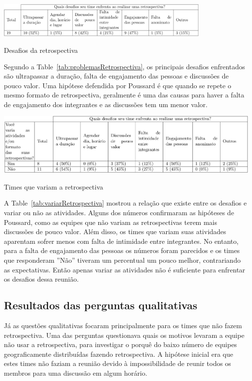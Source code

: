 \documentclass[12pt]{article}
\begin{document}
\begin{table}[ht]
\centering
\includegraphics[width=0.8\textwidth]{problemasRetrospectiva.png}
\caption{Desafios da retrospectiva}
\label{tab:problemasRetrospectiva}
\end{table}

Segundo a Table~\ref{tab:problemasRetrospectiva}, os principais desafios enfrentados são ultrapassar a duração, falta de engajamento das pessoas e discussões de pouco valor. Uma hipótese defendida por Poussard \cite{poussaard:14} é que quando se repete o mesmo formato de retrospectiva, geralmente é uma das causas para haver a falta de engajamento dos integrantes e as discussões tem um menor valor.

\begin{table}[ht]
\centering
\includegraphics[width=1\textwidth]{variarRetrospectiva.png}
\caption{Times que variam a retrospectiva}
\label{tab:variarRetrospectiva}
\end{table}

A Table~\ref{tab:variarRetrospectiva} mostrou a relação que existe entre os desafios e variar ou não as atividades. Alguns dos números confirmaram as hipóteses de Poussard, como as equipes que não variam as retrospectivas terem mais discussões de pouco valor. Além disso, os times que variam suas atividades aparentam sofrer menos com falta de intimidade entre integrantes. No entanto, para a falta de engajamento das pessoas os números foram parecidos e os times que responderam ''Não'' tiveram um percentual um pouco melhor, contrariando as expectativas. Então apenas variar as atividades não é suficiente para enfrentar os desafios dessa reunião.

\subsection{Resultados das perguntas qualitativas}

Já as questões qualitativas focaram principalmente para os times que não fazem retrospectiva. Uma das perguntas questionava quais os motivos levaram a equipe não usar a retrospectiva, para investigar o porquê do baixo número de equipes geograficamente distribuídas fazendo retrospectiva. A hipótese inicial era que estes times não faziam a reunião devido à impossibilidade de reunir todos os membros para uma discussão em algum horário.
\end{document}
